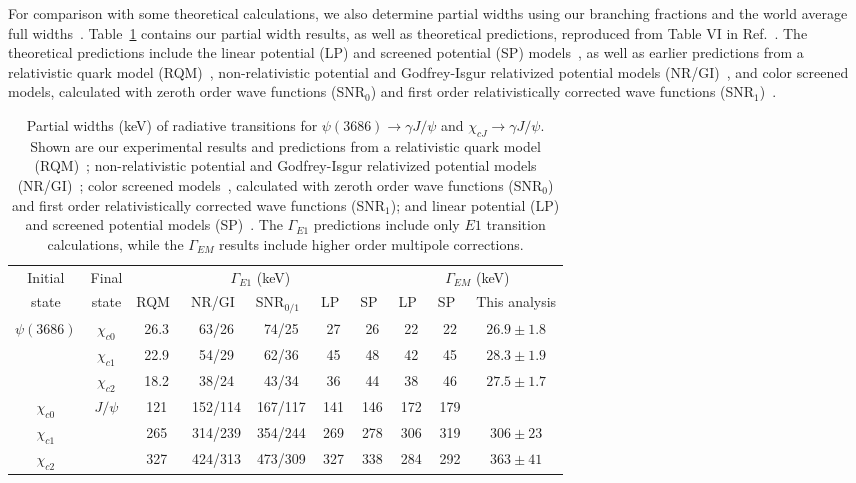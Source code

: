 \documentclass[aps,prd,twocolumn,showpacs,floatfix,byrevtex]{revtex4-1}
\newcommand\T{\rule{0pt}{2.6ex}}       %
\newcommand\B{\rule[-1.2ex]{0pt}{0pt}} %
\begin{document}
For comparison with some theoretical calculations, we also determine
partial widths using our branching fractions and the world average
full widths~\cite{PDG16}.  Table~\ref{widths} contains our partial
width results, as well as theoretical predictions, reproduced from
Table VI in Ref.~\cite{Deng1}. The theoretical predictions include the
linear potential (LP) and screened potential (SP) models~\cite{Deng1},
as well as earlier predictions from a relativistic quark model
(RQM)~\cite{RQM}, non-relativistic potential and Godfrey-Isgur
relativized potential models (NR/GI)~\cite{NR/GI}, and color screened
models, calculated with zeroth order wave functions (SNR$_0$) and
first order relativistically corrected wave functions
(SNR$_1$)~\cite{SNR}.

\begin{table*}[tb]
\centering
\caption{Partial widths (keV) of radiative transitions for $\psi(3686)
  \to \gamma J/\psi$ and $\chi_{cJ} \to \gamma J/\psi$.  Shown are
  our experimental results and predictions from a relativistic quark
  model (RQM)~\cite{RQM}; non-relativistic potential and Godfrey-Isgur relativized potential
  models (NR/GI)~\cite{NR/GI}; color screened  models~\cite{SNR}, calculated with  zeroth order wave functions (SNR$_0$) and
  first order relativistically  corrected wave functions 
  (SNR$_{1}$); and linear potential
  (LP) and screened potential models (SP)~\cite{Deng1}.  The $\Gamma_{E1}$ predictions include only $E1$ transition calculations, while the $\Gamma_{EM}$ results include higher order multipole corrections.}
\vspace{0.05 in}
\begin{tabular}{c|c|ccccc|ccc} \hline \hline
\T Initial & Final & \multicolumn{5}{c|}{$\Gamma_{E1}$ (keV)} & \multicolumn{3}{c}{$\Gamma_{EM}$ (keV)} \B  \\ \cline{3-10} 
\T state   & state & RQM~\cite{RQM} & NR/GI~\cite{NR/GI} & SNR$_{0/1}$~\cite{SNR} & LP~\cite{Deng1} & SP~\cite{Deng1} & LP~\cite{Deng1} & SP~\cite{Deng1} & This analysis \B \\ \hline 
\T $\psi(3686)$ & $\chi_{c0}$ & 26.3 & 63/26 & 74/25 & 27 & 26 & 22 & 22 & $26.9 \pm 1.8$ \\
           & $\chi_{c1}$ & 22.9 & 54/29 & 62/36 & 45 & 48 & 42 & 45 & $28.3\pm1.9$ \\
           & $\chi_{c2}$ & 18.2 & 38/24 & 43/34 & 36 & 44 & 38 & 46 & $ 27.5\pm1.7$ \B \\ \hline
\T $\chi_{c0}$ & $J/\psi$   & 121 & 152/114& 167/117 & 141 & 146 & 172& 179  &\\
$\chi_{c1}$ &            & 265 & 314/239& 354/244 & 269 & 278 & 306 & 319 & $306 \pm 23$ \\
$\chi_{c2}$ &            & 327 & 424/313 & 473/309 & 327 & 338& 284 & 292 & $ 363\pm41$ \B \\ \hline  \hline
\end{tabular}
\label{widths}
\end{table*}
\end{document}
